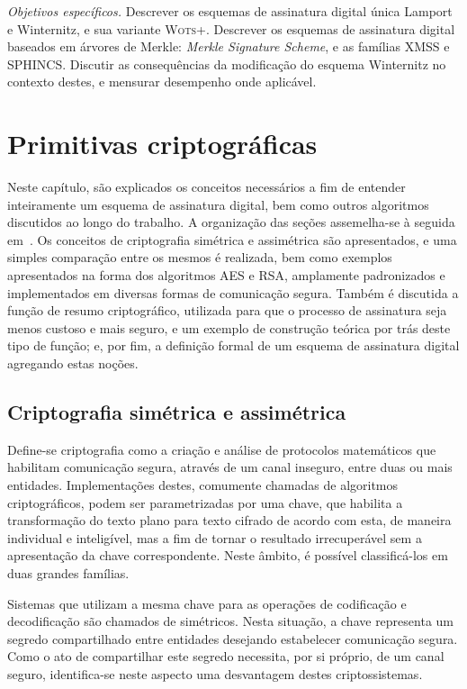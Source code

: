 \documentclass[12pt]{report}
\begin{document}
\emph{Objetivos específicos.} Descrever os esquemas de assinatura digital única
Lamport e Winternitz, e sua variante \textsc{Wots+}. Descrever os esquemas de
assinatura digital baseados em árvores de Merkle: \emph{Merkle Signature
Scheme}, e as famílias XMSS e SPHINCS. Discutir as consequências da modificação
do esquema Winternitz no contexto destes, e mensurar desempenho onde aplicável.

\chapter{Primitivas criptográficas}

Neste capítulo, são explicados os conceitos necessários
a fim de entender inteiramente um esquema de assinatura digital, bem como outros
algoritmos discutidos ao longo do trabalho. A organização das seções assemelha-se
à seguida em~\cite{Gathen:2015:CRY:2857293}. Os conceitos de criptografia simétrica
e assimétrica são apresentados, e uma simples comparação entre os mesmos é realizada, 
bem como exemplos apresentados na forma dos algoritmos AES e RSA, amplamente
padronizados e implementados em diversas formas de comunicação segura. Também é
discutida a função de resumo criptográfico, utilizada para que o processo de assinatura
seja menos custoso e mais seguro, e um exemplo de construção teórica por trás
deste tipo de função; e, por fim, a definição formal de um esquema de assinatura
digital agregando estas noções.

\section{Criptografia simétrica e assimétrica}

Define-se criptografia como a criação e análise de protocolos
matemáticos que habilitam comunicação segura, através de um canal
inseguro, entre duas ou mais entidades. Implementações destes,
comumente chamadas de algoritmos criptográficos,
podem ser parametrizadas por uma chave, que habilita a transformação
do texto plano para texto cifrado de acordo
com esta, de maneira individual e inteligível, mas a fim de tornar o
resultado irrecuperável sem a apresentação da chave correspondente.
Neste âmbito, é possível classificá-los em duas grandes famílias.

Sistemas que utilizam a mesma chave para as operações de codificação
e decodificação são chamados de simétricos. Nesta situação, a chave
representa um segredo compartilhado entre entidades desejando
estabelecer comunicação segura. Como o ato de compartilhar
este segredo necessita, por si próprio, de um canal seguro,
identifica-se neste aspecto uma desvantagem destes criptossistemas.
\end{document}
